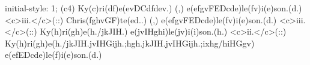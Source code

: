 initial-style: 1;
(c4) Ky(c)ri(df)e(evDCdfdev.) (,) e(efgvFEDcde)le(fv)i(e)son.(d.) <c>iii.</c>(::) Chris(fghvGF)te(ed..) (,) e(efgvFEDcde)le(fv)i(e)son.(d.) <c>iii.</c>(::) Ky(h)ri(gh)e(h./jkJIH.) e(jvIHghi)le(jv)i(i)son.(h.) <c>ii.</c>(::) Ky(h)ri(gh)e(h./jkJIH.jvIHGijh.;hgh.jkJIH.jvIHGijh.;ixhg/hiHGgv) e(efEDcde)le(f)i(e)son.(d.)
